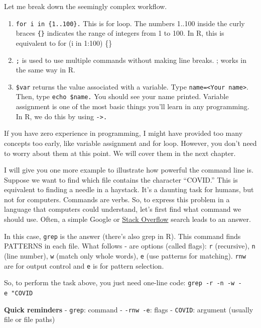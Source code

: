 \documentclass[
]{book}
\begin{document}
Let me break down the seemingly complex workflow.

\begin{enumerate}
\def\labelenumi{\arabic{enumi}.}
\item
  \texttt{for\ i\ in\ \{1..100\}.} This is for loop. The numbers 1..100 inside the curly braces \texttt{\{\}} indicates the range of integers from 1 to 100. In R, this is equivalent to for (i in 1:100) \{\}
\item
  \texttt{;} is used to use multiple commands without making line breaks. ; works in the same way in R.
\item
  \texttt{\$var} returns the value associated with a variable. Type \texttt{name=\textless{}Your\ name\textgreater{}}. Then, type \texttt{echo\ \$name.} You should see your name printed. Variable assignment is one of the most basic things you'll learn in any programming. In R, we do this by using \texttt{-\textgreater{}.}
\end{enumerate}

If you have zero experience in programming, I might have provided too many concepts too early, like variable assignment and for loop. However, you don't need to worry about them at this point. We will cover them in the next chapter.

I will give you one more example to illustrate how powerful the command line is. Suppose we want to find which file contains the character ``COVID.'' This is equivalent to finding a needle in a haystack. It's a daunting task for humans, but not for computers. Commands are verbs. So, to express this problem in a language that computers could understand, let's first find what command we should use. Often, a simple Google or \href{https://stackoverflow.com/}{Stack Overflow} search leads to an answer.

In this case, \texttt{grep} is the answer (there's also grep in R). This command finds PATTERNS in each file. What follows - are options (called flags): \texttt{r} (recursive), \texttt{n} (line number), \texttt{w} (match only whole words), \texttt{e} (use patterns for matching). \texttt{rnw} are for output control and \texttt{e} is for pattern selection.

So, to perform the task above, you just need one-line code: \texttt{grep\ -r\ -n\ -w\ -e\ "COVID\textquotesingle{}\textquotesingle{}}

\textbf{Quick reminders}
- \texttt{grep}: command
- \texttt{-rnw\ -e}: flags
- \texttt{COVID}: argument (usually file or file paths)
\end{document}

